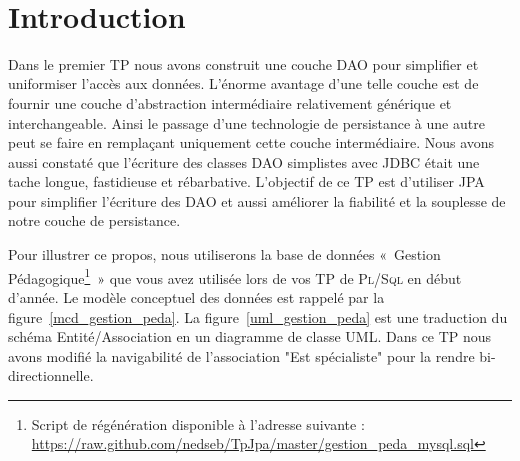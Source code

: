 \documentclass[a4paper,11pt]{article}
\date{}
\begin{document}
\lstset{
         breaklines=true,                                     %
         frame=ltrb,
         framesep=5pt,
         tabsize=4,
         frameround=ftft,
         showstringspaces=false
}

\newlength{\niveauZero}
\newlength{\niveauUn}
\newlength{\niveauDeux}
\newlength{\niveauTrois}
\newlength{\niveauQuatre}
\newlength{\niveauCinq}

\newlength{\colonneZero}
\newlength{\colonneUn}
\newlength{\colonneDeux}
\newlength{\colonneTrois}
\newlength{\colonneQuatre}
\newlength{\colonneCinq}


\setcounter{compteurQuestion}{0}
\newcommand{\Question}{\paragraph*{Question~\thecompteurQuestion~:}\addtocounter{compteurQuestion}{1}}

{\centering
    \mbox{
    }
}\\[0.4cm]
\section{Introduction}

Dans le premier TP nous avons construit une couche DAO pour simplifier et uniformiser l'accès aux données. L'énorme 
avantage d'une telle couche est de fournir une couche d'abstraction intermédiaire relativement générique et 
interchangeable. Ainsi le passage d'une technologie de persistance à une autre peut se faire en remplaçant uniquement 
cette couche intermédiaire. Nous avons aussi constaté que l'écriture des classes DAO simplistes avec JDBC était une tache 
longue, fastidieuse et rébarbative. L'objectif de ce TP est d'utiliser JPA pour simplifier l'écriture des DAO et aussi 
améliorer la fiabilité et la souplesse de notre couche de persistance. 

Pour illustrer ce propos, nous utiliserons la base de données «~Gestion Pédagogique\footnote{Script de régénération disponible 
à l'adresse suivante : \url{https://raw.github.com/nedseb/TpJpa/master/gestion_peda_mysql.sql}}~» que vous avez utilisée lors de vos TP de \textsc{Pl/Sql} 
en début d'année. Le modèle conceptuel des données est rappelé par la figure~\ref{mcd_gestion_peda}. La figure~\ref{uml_gestion_peda} 
est une traduction du schéma Entité/Association en un  diagramme de classe UML. Dans ce TP nous avons modifié la 
navigabilité de l'association "Est spécialiste" pour la rendre bi-directionnelle.
\end{document}
